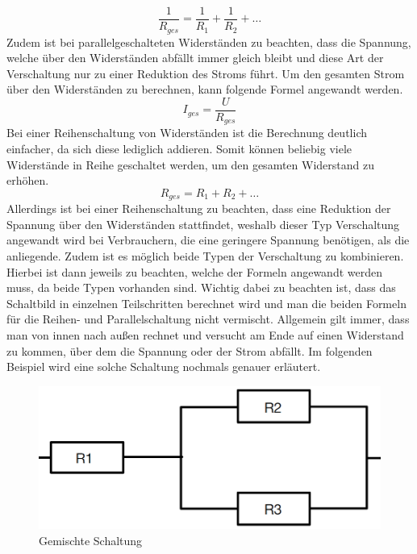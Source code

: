 \begin{equation}
\frac{1}{R_{ges}}=\frac{1}{R_1}+\frac{1}{R_2}+…
\label{eqn:Parallelschaltung von mehreren Widerständen}
\end{equation}
Zudem ist bei parallelgeschalteten Widerständen zu beachten, dass die Spannung, welche über den Widerständen abfällt immer gleich bleibt und diese Art der 
Verschaltung nur zu einer Reduktion des Stroms führt. Um den gesamten Strom über den Widerständen zu berechnen, kann folgende Formel angewandt werden.
\begin{equation}
I_{ges} = \frac{U}{R_{ges}}
\label{eqn:Gesamtstrom Parallelschaltung}
\end{equation}
Bei einer Reihenschaltung von Widerständen ist die Berechnung deutlich einfacher, da sich diese lediglich addieren. Somit können beliebig viele Widerstände in Reihe geschaltet werden, um den gesamten Widerstand zu erhöhen.
\begin{equation}
R_{ges}=R_1+R_2+…
\label{eqn:Widerstand Reihenschaltung}
\end{equation}
Allerdings ist bei einer Reihenschaltung zu beachten, dass eine Reduktion der Spannung über den Widerständen stattfindet, weshalb dieser Typ Verschaltung 
angewandt wird bei Verbrauchern, die eine geringere Spannung benötigen, als die anliegende. Zudem ist es möglich beide Typen der Verschaltung zu kombinieren. 
Hierbei ist dann jeweils zu beachten, welche der Formeln angewandt werden muss, da beide Typen vorhanden sind. Wichtig dabei zu beachten ist, dass das 
Schaltbild in einzelnen Teilschritten berechnet wird und man die beiden Formeln für die Reihen- und Parallelschaltung nicht vermischt. 
Allgemein gilt immer, dass man von innen nach außen rechnet und versucht am Ende auf einen Widerstand zu kommen, über dem die Spannung oder der Strom abfällt.
\clearpage
Im folgenden Beispiel wird eine solche Schaltung nochmals genauer erläutert.
\begin{figure}[hbt]
    \centering
    \includegraphics[width=0.8\linewidth]{images/Gemischte Schaltung}
    \caption[Gemischte Schaltung]{Gemischte Schaltung}
    \label{fig:Gemischte Schaltung}
\end{figure}
